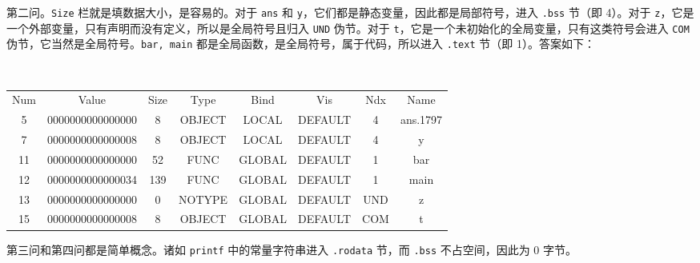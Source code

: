 \begin{problems}
        第二问。\verb|Size| 栏就是填数据大小，是容易的。对于 \verb|ans| 和 \verb|y|，它们都是静态变量，因此都是局部符号，进入 \verb|.bss| 节（即 4）。对于 \verb|z|，它是一个外部变量，只有声明而没有定义，所以是全局符号且归入 \verb|UND| 伪节。对于 \verb|t|，它是一个未初始化的全局变量，只有这类符号会进入 \verb|COM| 伪节，它当然是全局符号。\verb|bar, main| 都是全局函数，是全局符号，属于代码，所以进入 \verb|.text| 节（即 1）。答案如下：
        \begin{table}[H]
            \tt
            \centering
            \begin{tabular}{cccccccc}
                \hline
                \multicolumn{1}{|c}{Num} & Value & Size & Type & Bind & Vis & Ndx & \multicolumn{1}{c|}{Name} \\
                \multicolumn{1}{|c}{5} & 0000000000000000 & 8 & OBJECT & LOCAL & DEFAULT & 4 & \multicolumn{1}{c|}{ans.1797} \\
                \multicolumn{1}{|c}{7} & 0000000000000008 & 8 & OBJECT & LOCAL & DEFAULT & 4 & \multicolumn{1}{c|}{y} \\
                \multicolumn{1}{|c}{11} & 0000000000000000 & 52 & FUNC & GLOBAL & DEFAULT & 1 & \multicolumn{1}{c|}{bar} \\
                \multicolumn{1}{|c}{12} & 0000000000000034 & 139 & FUNC & GLOBAL & DEFAULT & 1 & \multicolumn{1}{c|}{main} \\
                \multicolumn{1}{|c}{13} & 0000000000000000 & 0 & NOTYPE & GLOBAL & DEFAULT & UND & \multicolumn{1}{c|}{z} \\
                \multicolumn{1}{|c}{15} & 0000000000000008 & 8 & OBJECT & GLOBAL & DEFAULT & COM & \multicolumn{1}{c|}{t} \\ \hline
            \end{tabular}
        \end{table}

        第三问和第四问都是简单概念。诸如 \verb|printf| 中的常量字符串进入 \verb|.rodata| 节，而 \verb|.bss| 不占空间，因此为 0 字节。


\end{problems}
